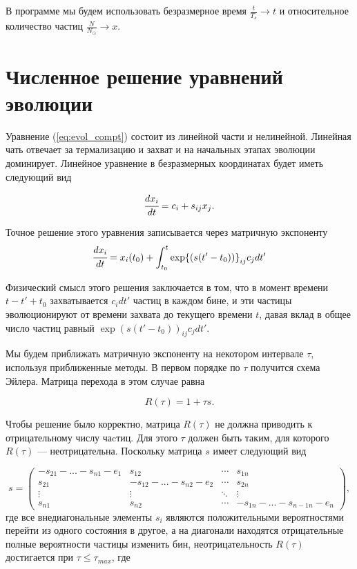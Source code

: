 В программе мы будем использовать безразмерное время $\frac{t}{T_s} \rightarrow t$ и относительное количество частиц $\frac{N}{N_{\odot}}\rightarrow x$. 


\section{Численное решение уравнений эволюции}

Уравнение (\ref{eq:evol_compt}) состоит из линейной части и нелинейной. Линейная чать отвечает за термализацию и захват и на начальных этапах эволюции доминирует. Линейное уравнение в безразмерных координатах будет иметь следующий вид

\begin{equation}
	\label{eq:evol_x}
	\cfrac{d x_i}{d t}  = c_{i} + s_{ij} x_j.
\end{equation}

Точное решение этого уравнения записывается через матричную экспоненту 
\begin{equation}
	\label{eq:evol_solve}
	\cfrac{d x_i}{d t}  = x_i(t_0) + \int_{t_0}^{t}{\exp{(s (t'-t_0))}_{ij}c_{j}dt'}
\end{equation}

Физический смысл этого решения заключается в том, что в момент времени $t-t'+t_0$ захватывается $c_i dt'$ частиц в каждом бине, и эти частицы эволюционируют от времени захвата до текущего времени $t$, давая вклад в общее число частиц равный $\exp{(s (t'-t_0))}_{ij}c_{j}dt'$. 

Мы будем приближать матричную экспоненту на некотором интервале $\tau$, используя приближенные методы. 
В первом порядке по $\tau$ получится схема Эйлера. Матрица перехода в этом случае равна

\begin{equation}
	\label{eq:R_tau_euler}
	R(\tau) = 1 + \tau s.
\end{equation}

Чтобы решение было корректно, матрица $R(\tau)$ не должна приводить к отрицательному числу чаcтиц. Для этого $\tau$ должен быть таким, для которого $R(\tau)$ --- неотрицательна. Поскольку матрица $s$ имеет следующий вид 

\begin{equation*}
	\label{s_matrix_view}
	s = \begin{pmatrix}
		-s_{21}-...-s_{n1}-e_1 & s_{12} & \cdots & s_{1n} \\
		s_{21} & -s_{12}-... - s_{n2}-e_2 & \cdots & s_{2n} \\
		\vdots & \vdots & \ddots & \vdots \\
		s_{n1} & s_{n2} & \cdots & -s_{1n}-... - s_{n-1n}-e_n
	\end{pmatrix},
\end{equation*}
где все внедиагональные элементы $s_i$ являются положительными вероятностями перейти из одного состояния в другое, а на диагонали находятся отрицательные полные вероятности частицы изменить бин, неотрицательность 
$R(\tau)$ достигается при $\tau  \le \tau_{max}$, где

